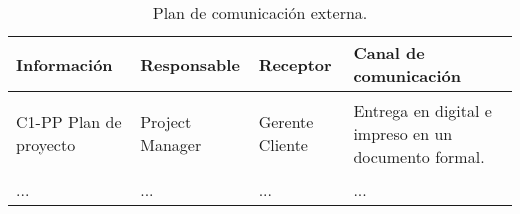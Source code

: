 \begin{table}[hbtp!]
    \noindent\begin{tabular}{|p{}|p{}|p{}|p{}|}
    	\hline
    	{\bf Información} & {\bf Responsable} & {\bf Receptor} & {\bf Canal de comunicación}\\
    	\hline
    	C1-PP Plan de proyecto & Project Manager &
    \begin{Titemize}
    	\Titem Gerente
    	\Titem Cliente 
    \end{Titemize}
     & Entrega en digital e impreso en un documento formal.\\
    	\hline	 
    	... & ... & ... & ... \\
    	\hline
    \end{tabular}
	\caption{Plan de comunicación externa.}
	\label{tbl:planComunicacionExt}
\end{table}
